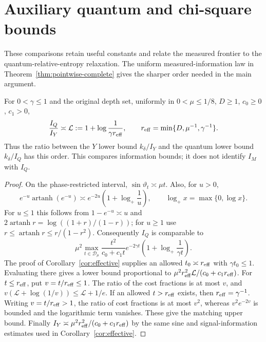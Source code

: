 \section{Auxiliary quantum and chi-square bounds}
\label{app:auxiliary-readout}
These comparisons retain useful constants and relate the measured
frontier to the quantum-relative-entropy relaxation. The uniform
measured-information law in Theorem~\ref{thm:pointwise-complete} gives
the sharper order needed in the main argument.

\begin{proposition}\label{prop:regimegap}
For $0<\gamma\leq1$ and the original depth set, uniformly in
$0<\mu\leq1/8$, $D\geq1$, $c_0\geq0$, $c_1>0$,
\begin{equation}\label{eq:optimizedgap}
 \frac{I_Q}{I_Y}\asymp
 \mathcal L:=1+\log\frac1{\gamma r_{\mathrm{eff}}},
 \qquad r_{\mathrm{eff}}=\min\{D,\mu^{-1},\gamma^{-1}\}.
\end{equation}
Thus the ratio between the $Y$ lower bound $k_\delta/I_Y$ and the
quantum lower bound $k_\delta/I_Q$ has this order. This compares
information bounds; it does not identify $I_M$ with $I_Q$.
\end{proposition}
\begin{proof}
On the phase-restricted interval, $\sin\vartheta_t\asymp\mu t$.
Also, for $u>0$,
\[
 e^{-u}\operatorname{artanh}(e^{-u})
 \asymp e^{-2u}\left(1+\log_+\frac1u\right),
 \qquad \log_+x=\max\{0,\log x\}.
\]
For $u\leq1$ this follows from
$1-e^{-u}\asymp u$ and
$2\operatorname{artanh}r=\log((1+r)/(1-r))$;
for $u\geq1$ use $r\leq\operatorname{artanh}r\leq r/(1-r^2)$.
Consequently $I_Q$ is comparable to
\[
 \mu^2\max_{t\in\mathcal D_\mu}
 \frac{t^2}{c_0+c_1t}e^{-2\gamma t}
       \left(1+\log_+\frac1{\gamma t}\right).
\]
The proof of Corollary~\ref{cor:effective} supplies an allowed
$t_0\asymp r_{\mathrm{eff}}$ with $\gamma t_0\leq1$. Evaluating there gives a lower
bound proportional to
$\mu^2r_{\mathrm{eff}}^2\mathcal L/(c_0+c_1r_{\mathrm{eff}})$.
For $t\leq r_{\mathrm{eff}}$, put $v=t/r_{\mathrm{eff}}\leq1$. The ratio of the cost fractions
is at most $v$, and
$v(\mathcal L+\log(1/v))\leq\mathcal L+1/e$.
If an allowed $t>r_{\mathrm{eff}}$ exists, then $r_{\mathrm{eff}}=\gamma^{-1}$.
Writing $v=t/r_{\mathrm{eff}}>1$, the ratio of cost fractions is at most $v^2$,
whereas $v^2e^{-2v}$ is bounded and the logarithmic term vanishes.
These give the matching upper bound. Finally
$I_Y\asymp\mu^2r_{\mathrm{eff}}^2/(c_0+c_1r_{\mathrm{eff}})$ by the same sine and
signal-information estimates used in Corollary~\ref{cor:effective}.
\end{proof}




